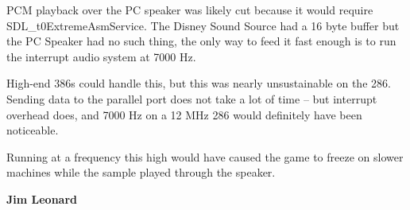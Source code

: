  \begin{fancyquotes}
 PCM playback over the PC speaker was likely cut because it would require SDL\_t0ExtremeAsmService. The Disney Sound Source had a 16 byte buffer but the PC Speaker had no such thing, the only way to feed it fast enough is to run the interrupt audio system at 7000 Hz.\\
 \par
  High-end 386s could handle this, but this was nearly unsustainable on the 286. Sending data to the parallel port does not take a lot of time -- but interrupt overhead does, and 7000 Hz on a 12 MHz 286 would definitely have been noticeable.\\
 \par
 Running at a frequency this high would have caused the game to freeze on slower machines while the sample played through the speaker.\\
\par
 \textbf{Jim Leonard}
\end{fancyquotes}\\
\par









